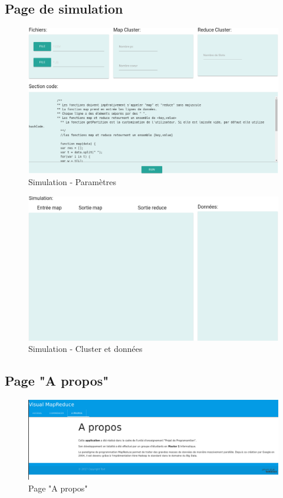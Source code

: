 \subsection{Page de simulation}
\begin{figure}[H]
  \centering
    \includegraphics[width=1\textwidth]{images/resultat_simulation_1.jpg}
        \caption{Simulation - Paramètres}
        \label{fig:Sim-Param}
\end{figure}
\begin{figure}[H]
  \centering
    \includegraphics[width=1\textwidth]{images/resultat_simulation_2.jpg}
        \caption{Simulation - Cluster et données}
        \label{fig:sim-cluster}
\end{figure}

\subsection{Page "A propos"}
\begin{figure}[H]
  \centering
    \includegraphics[width=1\textwidth]{images/apropos.png}
        \caption{Page "A propos"}
        \label{fig:Apropos}
\end{figure}
